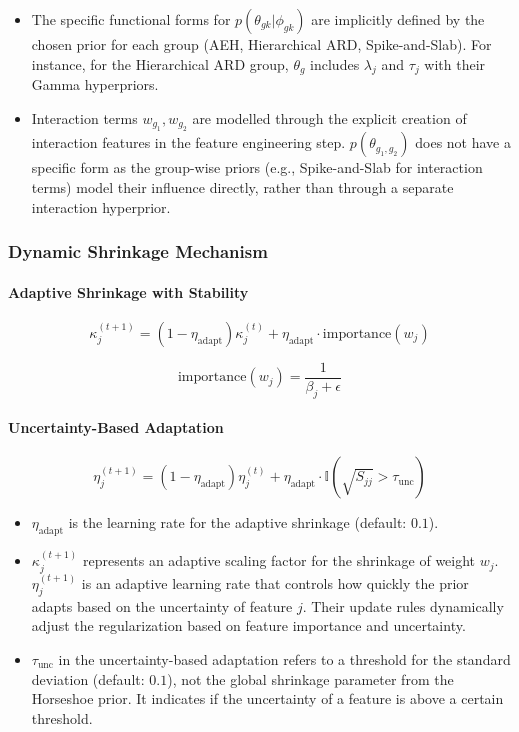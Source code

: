 \begin{itemize}

\item The specific functional forms for $p(\theta_{gk}|\phi_{gk})$ are implicitly defined by the chosen prior for each group (AEH, Hierarchical ARD, Spike-and-Slab). For instance, for the Hierarchical ARD group, $\theta_g$ includes $\lambda_j$ and $\tau_j$ with their Gamma hyperpriors.

\item Interaction terms $w_{g_1}, w_{g_2}$ are modelled through the explicit creation of interaction features in the feature engineering step. $p(\theta_{g_1,g_2})$ does not have a specific form as the group-wise priors (e.g., Spike-and-Slab for interaction terms) model their influence directly, rather than through a separate interaction hyperprior.

\end{itemize}

\subsubsection{Dynamic Shrinkage Mechanism}

\paragraph{Adaptive Shrinkage with Stability}
\[
\kappa_j^{(t+1)} = (1-\eta_{\text{adapt}})\kappa_j^{(t)} + \eta_{\text{adapt}} \cdot \text{importance}(w_j) 
\]

\[
\text{importance}(w_j) = \frac{1}{\beta_j + \epsilon}
\]

\paragraph{Uncertainty-Based Adaptation}
\[
\eta_j^{(t+1)} = (1-\eta_{\text{adapt}})\eta_j^{(t)} + \eta_{\text{adapt}} \cdot \mathbb{I}(\sqrt{S_{jj}} > \tau_{\text{unc}})
\]

\begin{itemize}

\item $\eta_{\text{adapt}}$ is the learning rate for the adaptive shrinkage (default: $0.1$). 

\item $\kappa_j^{(t+1)}$ represents an adaptive scaling factor for the shrinkage of weight $w_j$. $\eta_j^{(t+1)}$ is an adaptive learning rate that controls how quickly the prior adapts based on the uncertainty of feature $j$. Their update rules dynamically adjust the regularization based on feature importance and uncertainty.

\item $\tau_{\text{unc}}$ in the uncertainty-based adaptation refers to a threshold for the standard deviation (default: $0.1$), not the global shrinkage parameter from the Horseshoe prior. It indicates if the uncertainty of a feature is above a certain threshold.

\end{itemize}

